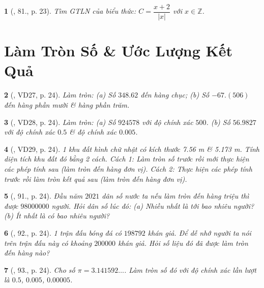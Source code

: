 \documentclass{article}
\newtheorem{baitoan}{}
\begin{document}
\begin{baitoan}[\cite{Binh_Toan_7_tap_1}, 81., p. 23]
	Tìm {\rm GTLN} của biểu thức: $C = \dfrac{x + 2}{|x|}$ với $x\in\mathbb{Z}$.
\end{baitoan}


\section{Làm Tròn Số \& Ước Lượng Kết Quả}

\begin{baitoan}[\cite{Tuyen_Toan_7}, VD27, p. 24]
	Làm tròn: (a) Số $348.62$ đến hàng chục;
	(b) Số $-67.(506)$ đến hàng phần mười \& hàng phần trăm.
\end{baitoan}

\begin{baitoan}[\cite{Tuyen_Toan_7}, VD28, p. 24]
	Làm tròn: (a) Số $924578$ với độ chính xác $500$. (b) Số $56.9827$ với độ chính xác $0.5$ \& độ chính xác $0.005$.
\end{baitoan}

\begin{baitoan}[\cite{Tuyen_Toan_7}, VD29, p. 24]
	1 khu đất hình chữ nhật có kích thước {\rm7.56 m} \& {\rm5.173 m}. Tính diện tích khu đất đó bằng 2 cách. Cách 1: Làm tròn số trước rồi mới thực hiện các phép tính sau (làm tròn đến hàng đơn vị). Cách 2: Thực hiện các phép tính trước rồi làm tròn kết quả sau (làm tròn đến hàng đơn vị).
\end{baitoan}

\begin{baitoan}[\cite{Tuyen_Toan_7}, 91., p. 24]
	Đầu năm $2021$ dân số nước ta nếu làm tròn đến hàng triệu thì được $98000000$ người. Hỏi dân số lúc đó: (a) Nhiều nhất là tới bao nhiêu người? (b) Ít nhất là có bao nhiêu người?
\end{baitoan}

\begin{baitoan}[\cite{Tuyen_Toan_7}, 92., p. 24]
	1 trận đấu bóng đá có $198 792$ khán giả. Để dễ nhớ người ta nói trên trận đấu này có khoảng $200000$ khán giả. Hỏi số liệu đó đã được làm tròn đến hàng nào?
\end{baitoan}

\begin{baitoan}[\cite{Tuyen_Toan_7}, 93., p. 24]
	Cho số $\pi = 3.141592\ldots$. Làm tròn số đó với độ chính xác lần lượt là $0.5$, $0.005$, $0.00005$.
\end{baitoan}
\end{document}
